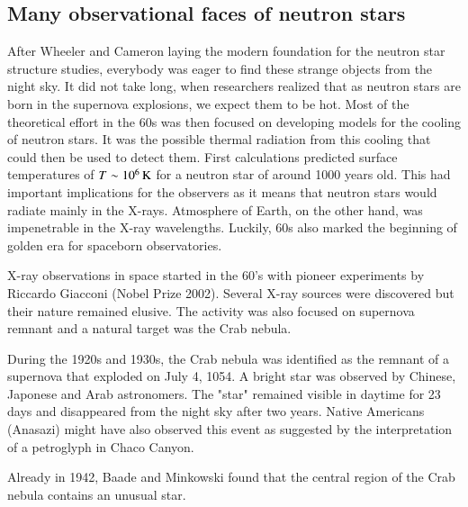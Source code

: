 \subsection{Many observational faces of neutron stars}

After Wheeler and Cameron laying the modern foundation for the neutron star structure studies, everybody was eager to find these strange objects from the night sky.
It did not take long, when researchers realized that as neutron stars are born in the supernova explosions, we expect them to be hot.
Most of the theoretical effort in the 60s was then focused on developing models for the cooling of neutron stars.
It was the possible thermal radiation from this cooling that could then be used to detect them.
First calculations predicted surface temperatures of $T \sim 10^6 \, \mathrm{K}$ for a neutron star of around 1000 years old\cite{CS64}.
This had important implications for the observers as it means that neutron stars would radiate mainly in the X-rays.
Atmosphere of Earth, on the other hand, was impenetrable in the X-ray wavelengths.
Luckily, 60s also marked the beginning of golden era for spaceborn observatories.

X-ray observations in space started in the 60’s with pioneer experiments by Riccardo Giacconi (Nobel Prize 2002).
Several X-ray sources were discovered but their nature remained elusive.
The activity was also focused on supernova remnant and a natural target was the Crab nebula.

During the 1920s and 1930s, the Crab nebula was identified as the remnant of a supernova that exploded on July 4, 1054.
A bright star was observed by Chinese, Japonese and Arab astronomers. 
The "star" remained visible in daytime for 23 days and disappeared from the night sky after two years.
Native Americans (Anasazi) might have also observed this event as suggested by the interpretation of a petroglyph in Chaco Canyon.

Already in 1942, Baade and Minkowski found that the central region of the Crab nebula contains an unusual star.

